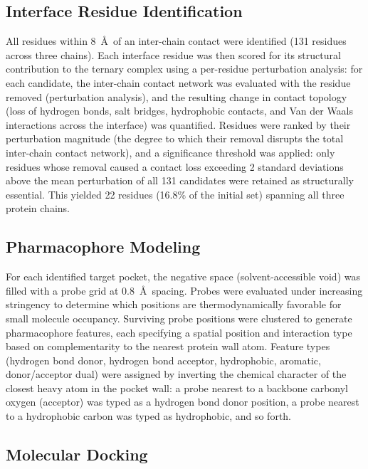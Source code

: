 \documentclass[11pt,a4paper]{article}
\begin{document}
\subsection{Interface Residue Identification}

All residues within 8~\AA\ of an inter-chain contact were identified (131 residues across three chains). Each interface residue was then scored for its structural contribution to the ternary complex using a per-residue perturbation analysis: for each candidate, the inter-chain contact network was evaluated with the residue removed (perturbation analysis), and the resulting change in contact topology (loss of hydrogen bonds, salt bridges, hydrophobic contacts, and Van der Waals interactions across the interface) was quantified. Residues were ranked by their perturbation magnitude (the degree to which their removal disrupts the total inter-chain contact network), and a significance threshold was applied: only residues whose removal caused a contact loss exceeding 2 standard deviations above the mean perturbation of all 131 candidates were retained as structurally essential. This yielded 22 residues (16.8\% of the initial set) spanning all three protein chains.

\subsection{Pharmacophore Modeling}

For each identified target pocket, the negative space (solvent-accessible void) was filled with a probe grid at 0.8~\AA\ spacing. Probes were evaluated under increasing stringency to determine which positions are thermodynamically favorable for small molecule occupancy. Surviving probe positions were clustered to generate pharmacophore features, each specifying a spatial position and interaction type based on complementarity to the nearest protein wall atom. Feature types (hydrogen bond donor, hydrogen bond acceptor, hydrophobic, aromatic, donor/acceptor dual) were assigned by inverting the chemical character of the closest heavy atom in the pocket wall: a probe nearest to a backbone carbonyl oxygen (acceptor) was typed as a hydrogen bond donor position, a probe nearest to a hydrophobic carbon was typed as hydrophobic, and so forth.

\subsection{Molecular Docking}
\end{document}
